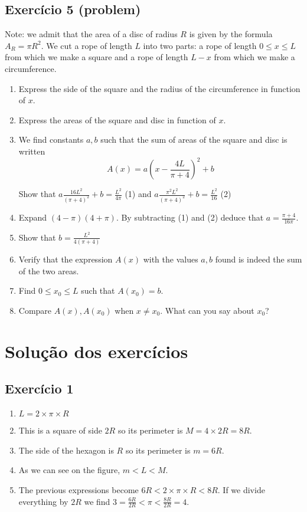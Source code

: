 \subsection*{Exercício 5 (problem)}

Note: we admit that the area of a disc of radius $R$ is given by the formula
$A_R = \pi R^2$.
We cut a rope of length $L$ into two parts: a rope of length $0 \leq x \leq L$
from which we make a square and a rope of length $L - x$ from which we make
a circumference.

\begin{enumerate}
\item Express the side of the square and the radius of the circumference in
  function of $x$.
\item Express the areas of the square and disc in function of $x$.
\item We find constants $a,b$ such that the sum of areas
  of the square and disc is written
  $$
  A(x) = a \left( x - \frac{4L}{\pi+4}\right)^2 + b
  $$

  Show that $a \frac{16L^2}{\left(\pi+4\right)^2} + b = \frac{L^2}{4\pi}$ (1)
  and $a \frac{\pi^2L^2}{\left(\pi+4\right)^2} + b = \frac{L^2}{16}$ (2)

\item Expand ${(4-\pi)}{(4+\pi)}$. By subtracting (1) and (2) deduce that
  $a = \frac{\pi+4}{16\pi}$.

\item Show that $b = \frac{L^2}{4\left(\pi+4\right)}$

\item Verify that the expression $A(x)$ with the values $a,b$ found is indeed
  the sum of the two areas.
  
\item Find $0 \leq x_0 \leq L$ such that $A(x_0) = b$.

\item Compare $A(x), A(x_0)$ when $x \neq x_0$. What can you say about $x_0$?
\end{enumerate}

\section{Solução dos exercícios}

\subsection*{Exercício 1}

\begin{enumerate}
\item $L = 2 \times \pi \times R$
\item This is a square of side $2R$ so its perimeter is
  $M = 4 \times 2R = 8R$.
\item The side of the hexagon is $R$ so its perimeter is
  $m = 6R$.
\item As we can see on the figure, $m < L < M$.
\item The previous expressions become $6R < 2 \times \pi \times R < 8R$.
  If we divide everything by $2R$ we find
  $3 = \frac{6R}{2R} < \pi < \frac{8R}{2R} = 4$.  
\end{enumerate}


